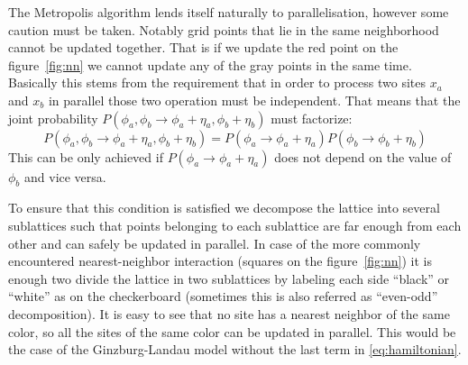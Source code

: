 \documentclass[a4paper]{llncs}
\begin{document}
The Metropolis algorithm lends itself naturally to parallelisation,
however some caution must be taken. Notably grid points that lie in
the same neighborhood cannot be updated together. That is if we update
the red point on the figure~\ref{fig:nn} we cannot update any of the
gray points in the same time.  Basically this stems from the
requirement that in order to process two sites $x_a$ and $x_b$ in
parallel those two operation must be independent.  That means that the
joint probability
$P(\phi_a,\phi_b\rightarrow\phi_a+\eta_a,\phi_b+\eta_b)$ must
factorize:
\begin{equation}
P(\phi_a,\phi_b\rightarrow\phi_a+\eta_a,\phi_b+\eta_b)
=P(\phi_a\rightarrow\phi_a+\eta_a)P(\phi_b\rightarrow\phi_b+\eta_b)
\end{equation}
This can be only achieved if $P(\phi_a\rightarrow\phi_a+\eta_a)$ does
not depend on the value of $\phi_b$ and vice versa.

To ensure that this condition is satisfied we decompose the lattice
into several sublattices such that points belonging to each sublattice
are far enough from each other and can safely be updated in
parallel. In case of the more commonly encountered nearest-neighbor
interaction (squares on the figure~\ref{fig:nn}) it is enough two
divide the lattice in two sublattices by labeling each side
``black'' or ``white'' as on the checkerboard (sometimes this is also
referred as ``even-odd'' decomposition). It is easy to see that no site
has a nearest neighbor of the same color, so all the sites of the
same color can be updated in parallel. This would be the case of the
Ginzburg-Landau model without the last term in \eqref{eq:hamiltonian}.
\end{document}

